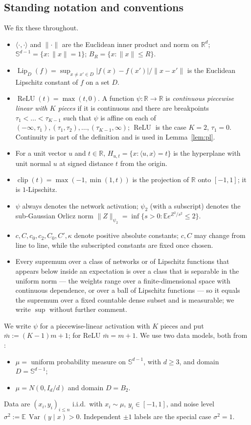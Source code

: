 \documentclass[11pt,reqno]{amsart}
\theoremstyle{plain}
\theoremstyle{definition}
\theoremstyle{remark}
\newcommand{\R}{\mathbb{R}}
\newcommand{\Sd}{\mathbb{S}^{d-1}}
\newcommand{\EE}{\mathbb{E}}
\newcommand{\Lip}{\operatorname{Lip}}
\newcommand{\relu}{\operatorname{ReLU}}
\newcommand{\inn}[2]{\langle #1,#2\rangle}
\DeclareMathOperator{\clip}{clip}
\DeclareMathOperator{\Var}{Var}
\begin{document}
\subsection{Standing notation and conventions}\label{ssec:notation}
We fix these throughout.
\begin{itemize}
\item $\inn{\cdot}{\cdot}$ and $\|\cdot\|$ are the Euclidean inner product and norm on $\R^d$; $\mathbb S^{d-1}=\{x:\|x\|=1\}$; $B_R=\{x:\|x\|\le R\}$.
\item $\Lip_D(f)=\sup_{x\ne x'\in D}|f(x)-f(x')|/\|x-x'\|$ is the Euclidean Lipschitz constant of $f$ on a set $D$.
\item $\relu(t)=\max(t,0)$. A function $\psi:\R\to\R$ is \emph{continuous piecewise linear with $K$ pieces} if it is continuous and there are breakpoints $\tau_1<\dots<\tau_{K-1}$ such that $\psi$ is affine on each of $(-\infty,\tau_1),(\tau_1,\tau_2),\dots,(\tau_{K-1},\infty)$; $\relu$ is the case $K=2$, $\tau_1=0$. Continuity is part of the definition and is used in Lemma~\ref{lem:pl}.
\item For a unit vector $u$ and $t\in\R$, $H_{u,t}=\{x:\inn{u}{x}=t\}$ is the hyperplane with unit normal $u$ at signed distance $t$ from the origin.
\item $\clip(t)=\max(-1,\min(1,t))$ is the projection of $\R$ onto $[-1,1]$; it is $1$-Lipschitz.
\item $\psi$ always denotes the network activation; $\psi_2$ (with a subscript) denotes the sub-Gaussian Orlicz norm $\|Z\|_{\psi_2}=\inf\{s>0:\EE e^{Z^2/s^2}\le2\}$.
\item $c,C,c_0,c_2,C_0,C',\kappa$ denote positive absolute constants; $c,C$ may change from line to line, while the subscripted constants are fixed once chosen.
\item Every supremum over a class of networks or of Lipschitz functions that appears below inside an expectation is over a class that is separable in the uniform norm --- the weights range over a finite-dimensional space with continuous dependence, or over a ball of Lipschitz functions --- so it equals the supremum over a fixed countable dense subset and is measurable; we write $\sup$ without further comment.
\end{itemize}
We write $\psi$ for a piecewise-linear activation with $K$ pieces and put $\bar m:=(K-1)m+1$; for ReLU $\bar m=m+1$. We use two data models, both from \cite{BLN}:
\begin{itemize}
\item[(S)] $\mu=$ uniform probability measure on $\Sd$, with $d\ge3$, and domain $D=\Sd$;
\item[(G)] $\mu=N(0,I_d/d)$ and domain $D=B_2$.
\end{itemize}
Data are $(x_i,y_i)_{i\le n}$ i.i.d.\ with $x_i\sim\mu$, $y_i\in[-1,1]$, and noise level $\sigma^2:=\EE\,\Var(y\mid x)>0$. Independent $\pm1$ labels are the special case $\sigma^2=1$.
\end{document}
